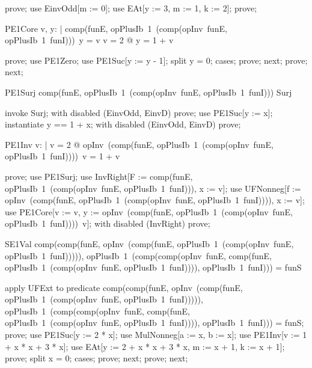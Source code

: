 \documentclass{article}
\begin{document}
\begin{zproof}
prove;
use EinvOdd[m := 0];
use EAt[y := 3, m := 1, k := 2];
prove;
\end{zproof}

\begin{theorem}{PE1Core}
  \forall v, y: \nat | comp(funE, opPlusIb~1~(comp(opInv~funE, opPlusIb~1~funI)))~y = v \land \lnot v = 2 @ y = 1 + v
\end{theorem}

\begin{zproof}
prove;
use PE1Zero;
use PE1Suc[y := y - 1];
split y = 0;
cases;
prove;
next;
prove;
next;
\end{zproof}

\begin{theorem}{PE1Surj}
  comp(funE, opPlusIb~1~(comp(opInv~funE, opPlusIb~1~funI))) \in Surj
\end{theorem}

\begin{zproof}
invoke Surj;
with disabled (EinvOdd, EinvD) prove;
use PE1Suc[y := x];
instantiate y == 1 + x;
with disabled (EinvOdd, EinvD) prove;
\end{zproof}

\begin{theorem}{PE1Inv}
  \forall v: \nat | \lnot v = 2 @ opInv~(comp(funE, opPlusIb~1~(comp(opInv~funE, opPlusIb~1~funI))))~v = 1 + v
\end{theorem}

\begin{zproof}
prove;
use PE1Surj;
use InvRight[F := comp(funE, opPlusIb~1~(comp(opInv~funE, opPlusIb~1~funI))), x := v];
use UFNonneg[f := opInv~(comp(funE, opPlusIb~1~(comp(opInv~funE, opPlusIb~1~funI)))), x := v];
use PE1Core[v := v, y := opInv~(comp(funE, opPlusIb~1~(comp(opInv~funE, opPlusIb~1~funI))))~v];
with disabled (InvRight) prove;
\end{zproof}

\begin{theorem}{SE1Val}
  comp(comp(funE, opInv~(comp(funE, opPlusIb~1~(comp(opInv~funE, opPlusIb~1~funI))))), opPlusIb~1~(comp(comp(opInv~funE, comp(funE, opPlusIb~1~(comp(opInv~funE, opPlusIb~1~funI)))), opPlusIb~1~funI))) = funS
\end{theorem}

\begin{zproof}
apply UFExt to predicate comp(comp(funE, opInv~(comp(funE, opPlusIb~1~(comp(opInv~funE, opPlusIb~1~funI))))), opPlusIb~1~(comp(comp(opInv~funE, comp(funE, opPlusIb~1~(comp(opInv~funE, opPlusIb~1~funI)))), opPlusIb~1~funI))) = funS;
prove;
use PE1Suc[y := 2 * x];
use MulNonneg[a := x, b := x];
use PE1Inv[v := 1 + x * x + 3 * x];
use EAt[y := 2 + x * x + 3 * x, m := x + 1, k := x + 1];
prove;
split x = 0;
cases;
prove;
next;
prove;
next;
\end{zproof}
\end{document}
